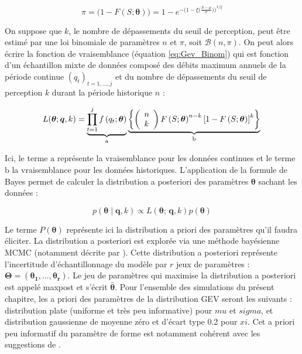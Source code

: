 \documentclass[11pt]{article}
\begin{document}
		\begin{equation}
			\pi = \biggl( 1 - F(S;\boldsymbol{\theta})\biggl) = 1 - e^{-\biggl(1-\xi\bigl(\frac{S-\mu}{\sigma}\bigl)\biggl)^{1/\xi} }		
		\end{equation}
			 
	On suppose que $k$, le nombre de dépassements du seuil de perception, peut être estimé par une loi binomiale de paramètres $n$ et $\pi$, soit $\mathcal{B}(n,\pi)$. On peut alors écrire la fonction de vraisemblance (équation \ref{eq:Gev_Binom}) qui est fonction d'un échantillon mixte de données composé des débits maximum annuels de la période continue $(q_t)_{t=1,...,j}$ et du nombre de dépassements du seuil de perception $k$ durant la période historique $n$ :
		
			\begin{equation}
			L(\boldsymbol{\theta} ; \boldsymbol{q}, k) = \underbrace{\prod_{t=1}^j f\left(q_t;\boldsymbol{\theta}\right)}_{\mathrm{a}} \underbrace{\left\{\left(\begin{array}{l}
			n \\
			k
			\end{array}\right) F\left(S;\boldsymbol{\theta}\right)^{n-k}\left[1-F\left(S;\boldsymbol{\theta}\right)\right]^k\right\}}_{\mathrm{b}} \\
			\label{eq:Gev_Binom}
			\end{equation}
			
			Ici, le terme $\mathrm{a}$ représente la vraisemblance pour les données continues et le terme $\mathrm{b}$ la vraisemblance pour les données historiques. L'application de la formule de Bayes permet de calculer la distribution a posteriori des paramètres $\boldsymbol{\theta}$ sachant les données :
			
			\begin{equation}
				p(\boldsymbol{\theta} \mid \boldsymbol{q},k) \propto L(\boldsymbol{\theta};\,\boldsymbol{q},k) p(\boldsymbol{\theta})
				\label{eq:BayesBinom}
			\end{equation}
	
		Le terme $P(\boldsymbol{\theta})$ représente ici la distribution a priori des paramètres qu'il faudra éliciter. La distribution a posteriori est explorée via une méthode bayésienne MCMC (notamment décrite par \citet{coles_classical_2001}). Cette distribution a posteriori représente l'incertitude d'échantillonnage du modèle par $r$ jeux de paramètres : $\boldsymbol{\Theta} = (\boldsymbol{\theta_1},...,\boldsymbol{\theta_r})$. Le jeu de paramètres qui maximise la distribution a posteriori est appelé maxpost et s'écrit $\boldsymbol{ \hat{\theta} }$. Pour l'ensemble des simulations du présent chapitre, les a priori des paramètres de la distribution GEV seront les suivants : distribution plate (uniforme et très peu informative) pour $mu$ et $sigma$, et distribution gaussienne de moyenne zéro et d'écart type 0.2 pour $xi$. Cet a priori peu informatif du paramètre de forme est notamment cohérent avec les suggestions de \citet{martins_generalized_2000}.
	
\end{document}
